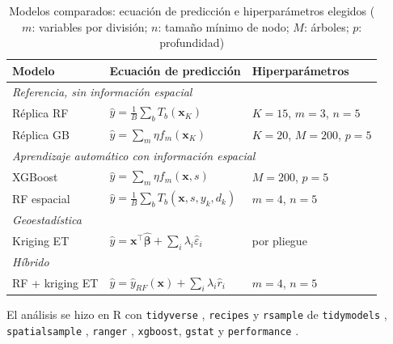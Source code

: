\documentclass[conference,letterpaper]{IEEEtran}
\begin{document}
\begin{table}[!t]
\caption{Modelos comparados: ecuación de predicción e hiperparámetros elegidos ($m$: variables por división; $n$: tamaño mínimo de nodo; $M$: árboles; $p$: profundidad)}
\label{tab:modelos}
\centering
\footnotesize
\setlength{\tabcolsep}{2.4pt}
\begin{tabular}{lll}
\toprule
Modelo & Ecuación de predicción & Hiperparámetros \\
\midrule
\multicolumn{3}{l}{\textit{Referencia, sin información espacial}} \\
Réplica RF & $\hat y=\tfrac{1}{B}\sum_{b}T_b(\mathbf{x}_K)$ & $K{=}15$, $m{=}3$, $n{=}5$ \\
Réplica GB & $\hat y=\sum_{m}\eta f_m(\mathbf{x}_K)$ & $K{=}20$, $M{=}200$, $p{=}5$ \\
\multicolumn{3}{l}{\textit{Aprendizaje automático con información espacial}} \\
XGBoost & $\hat y=\sum_{m}\eta f_m(\mathbf{x},s)$ & $M{=}200$, $p{=}5$ \\
RF espacial & $\hat y=\tfrac{1}{B}\sum_{b}T_b(\mathbf{x},s,y_k,d_k)$ & $m{=}4$, $n{=}5$ \\
\multicolumn{3}{l}{\textit{Geoestadística}} \\
Kriging ET & $\hat y=\mathbf{x}^{\top}\hat{\boldsymbol\beta}+\sum_{i}\lambda_i\hat\varepsilon_i$ & por pliegue \\
\multicolumn{3}{l}{\textit{Híbrido}} \\
RF + kriging ET & $\hat y=\hat y_{RF}(\mathbf{x})+\sum_{i}\lambda_i\hat r_i$ & $m{=}4$, $n{=}5$ \\
\bottomrule
\end{tabular}
\end{table}

El análisis se hizo en R con \texttt{tidyverse} \cite{wickham2019}, \texttt{recipes} y \texttt{rsample} de \texttt{tidymodels} \cite{kuhn2022}, \texttt{spatialsample} \cite{spatialsample2021}, \texttt{ranger} \cite{wright2017}, \texttt{xgboost}, \texttt{gstat} \cite{pebesma2004,graler2016} y \texttt{performance} \cite{ludecke2021}.
\end{document}
